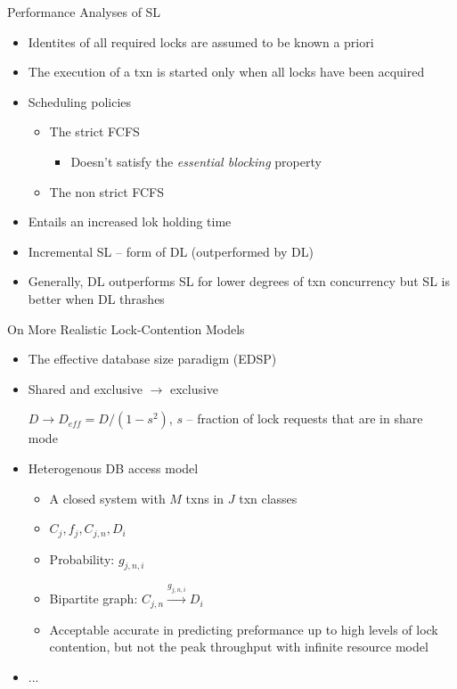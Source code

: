 \documentclass[sans]{beamer}
\begin{document}
\begin{frame}{Performance Analyses of SL}
  \begin{itemize}
    \item Identites of all required locks are assumed to be known a priori
    \item The execution of a txn is started only when all locks have been acquired
    \item Scheduling policies
      \begin{itemize}
        \item The strict FCFS
          \begin{itemize}
            \item Doesn't satisfy the \emph{essential blocking} property
          \end{itemize}
        \item The non strict FCFS
      \end{itemize}
    \item Entails an increased lok holding time
    \item Incremental SL -- form of DL (outperformed by DL)
    \item Generally, DL outperforms SL for lower degrees of txn concurrency but
      SL is better when DL thrashes
  \end{itemize}
\end{frame}

  

\begin{frame}{On More Realistic Lock-Contention Models}
  \begin{itemize}
    \item The effective database size paradigm (EDSP)
    \item Shared and exclusive $\rightarrow$ exclusive

    $D \rightarrow D_{eff} = D/(1 - s^2)$, $s$ -- fraction of lock requests
    that are in share mode

    \vfill

  \item Heterogenous DB access model
    \begin{itemize}
      \item A closed system with $M$ txns in $J$ txn classes
      \item $C_j, f_j, C_{j, n}, D_i$
      \item Probability: $g_{j, n, i}$
      \item Bipartite graph: $C_{j, n} \xrightarrow{g_{j, n, i}} D_i$
      
      \item \textcolor{myGray}{Acceptable accurate in predicting preformance up to high
        levels of lock contention, but not the peak throughput with infinite resource
        model}
    \end{itemize}
    
    \item ...
  \end{itemize}
\end{frame}
\end{document}

